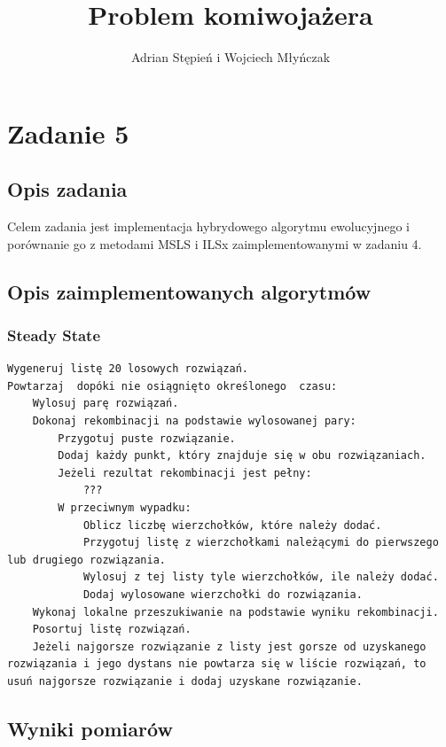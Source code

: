 \documentclass[a4paper]{article}
\title{Problem komiwojażera}
\author{Adrian Stępień i Wojciech Młyńczak}
\begin{document}
\maketitle

\section{Zadanie 5}

\subsection{Opis zadania}

Celem zadania jest implementacja hybrydowego algorytmu ewolucyjnego i porównanie go z metodami MSLS i ILSx zaimplementowanymi w zadaniu 4.

\subsection{Opis zaimplementowanych algorytmów}

\subsubsection{Steady State}

\begin{lstlisting}
Wygeneruj listę 20 losowych rozwiązań.
Powtarzaj  dopóki nie osiągnięto określonego  czasu:
    Wylosuj parę rozwiązań.
    Dokonaj rekombinacji na podstawie wylosowanej pary:
        Przygotuj puste rozwiązanie.
        Dodaj każdy punkt, który znajduje się w obu rozwiązaniach.
        Jeżeli rezultat rekombinacji jest pełny:
            ???
        W przeciwnym wypadku:
            Oblicz liczbę wierzchołków, które należy dodać.
            Przygotuj listę z wierzchołkami należącymi do pierwszego lub drugiego rozwiązania.
            Wylosuj z tej listy tyle wierzchołków, ile należy dodać.
            Dodaj wylosowane wierzchołki do rozwiązania.
    Wykonaj lokalne przeszukiwanie na podstawie wyniku rekombinacji.
    Posortuj listę rozwiązań.
    Jeżeli najgorsze rozwiązanie z listy jest gorsze od uzyskanego rozwiązania i jego dystans nie powtarza się w liście rozwiązań, to usuń najgorsze rozwiązanie i dodaj uzyskane rozwiązanie.
\end{lstlisting}

\subsection{Wyniki pomiarów}
\end{document}
